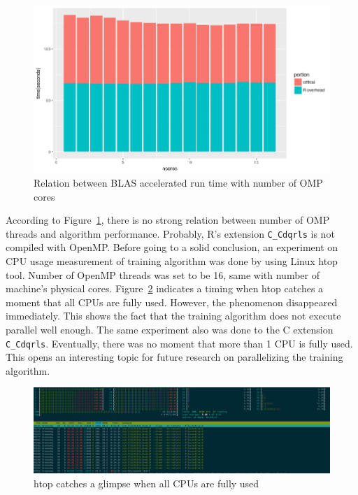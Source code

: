 \documentclass[English]{dicomopapers}
\begin{document}
\begin{figure}[ht]
  \centering
  \includegraphics[width=\textwidth/3,natwidth=857,natheight=484]{qr_blas_ret.png}
  \caption{Relation between BLAS accelerated run time with number of OMP cores}\label{fig:qr_blas_ret}
\end{figure}

 According to Figure~\ref{fig:qr_blas_ret}, there is no strong relation between number of OMP threads and algorithm performance. Probably, R's extension \texttt{C\_Cdqrls} is not compiled with OpenMP\@. Before going to a solid conclusion, an experiment on CPU usage measurement of training algorithm was done by using Linux htop tool. Number of OpenMP threads was set to be 16, same with number of machine's physical cores. Figure~\ref{fig:htop} indicates a timing when htop catches a moment that all CPUs are fully used. However, the phenomenon disappeared immediately. This shows the fact that the training algorithm does not execute parallel well enough. The same experiment also was done to the C extension \texttt{C\_Cdqrls}. Eventually, there was no moment that more than 1 CPU is fully used. This opens an interesting topic for future research on parallelizing the training algorithm.\newline

\begin{figure}[ht]
  \centering
  \includegraphics[width=\textwidth/3,natwidth=1902,natheight=550]{htop.png}
  \caption{htop catches a glimpse when all CPUs are fully used}\label{fig:htop}
\end{figure}
\end{document}
